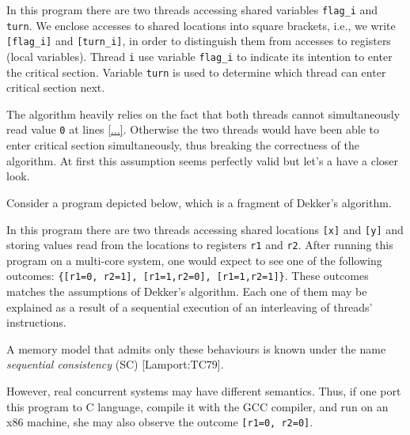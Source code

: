 \documentclass[a4paper,twoside,11pt]{article}
\numberwithin{equation}{section}
\begin{document}

In this program there are two threads accessing shared variables \texttt{flag\_i} and \texttt{turn}.
We enclose accesses to shared locations into square brackets, i.e., we write \texttt{[flag\_i]} and \texttt{[turn\_i]},
in order to distinguish them from accesses to registers (local variables).
Thread \texttt{i} use variable \texttt{flag\_i} to indicate its intention to enter the critical section.
Variable \texttt{turn} is used to determine which thread can enter critical section next. 


The algorithm heavily relies on the fact that both threads cannot simultaneously read value \texttt{0} at lines \ref{...}.
Otherwise the two threads would have been able to enter critical section simultaneously, thus breaking the correctness of the algorithm.
At first this assumption seems perfectly valid but let's a have a closer look.

Consider a program depicted below, which is a fragment of Dekker's algorithm.


In this program there are two threads accessing shared locations \texttt{[x]} and \texttt{[y]} and 
storing values read from the locations to registers \texttt{r1} and \texttt{r2}.
After running this program on a multi-core system, one would expect to see 
one of the following outcomes: \texttt{\{[r1=0, r2=1], [r1=1,r2=0], [r1=1,r2=1]\}}.
These outcomes matches the assumptions of Dekker's algorithm.
Each one of them may be explained as a result of a sequential execution of an interleaving of threads' instructions. 


A memory model that admits only these behaviours is known under the name \emph{sequential consistency} (SC) [Lamport:TC79].

However, real concurrent systems may have different semantics. 
Thus, if one port this program to C language, compile it with the GCC compiler, and run on an x86 machine,
she may also observe the outcome \texttt{[r1=0, r2=0]}.
\end{document}

